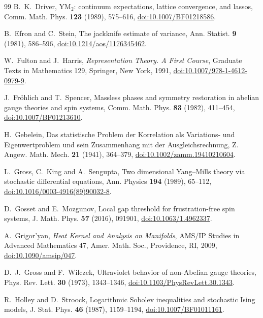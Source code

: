\begin{thebibliography}{99}
B.~K.~Driver, YM$_2$: continuum expectations, lattice convergence, and lassos, Comm. Math. Phys. \textbf{123} (1989), 575--616, \href{https://doi.org/10.1007/BF01218586}{doi:10.1007/BF01218586}.

B.~Efron and C.~Stein, The jackknife estimate of variance, Ann. Statist. \textbf{9} (1981), 586--596, \href{https://doi.org/10.1214/aos/1176345462}{doi:10.1214/aos/1176345462}.

W.~Fulton and J.~Harris, \emph{Representation Theory. A First Course},
Graduate Texts in Mathematics 129, Springer, New York, 1991,
\href{https://doi.org/10.1007/978-1-4612-0979-9}{doi:10.1007/978-1-4612-0979-9}.

J.~Fr\"ohlich and T.~Spencer, Massless phases and symmetry restoration in abelian gauge theories and spin systems, Comm. Math. Phys. \textbf{83} (1982), 411--454, \href{https://doi.org/10.1007/BF01213610}{doi:10.1007/BF01213610}.

H.~Gebelein, Das statistische Problem der Korrelation als Variations- und Eigenwertproblem und sein Zusammenhang mit der Ausgleichsrechnung, Z. Angew. Math. Mech. \textbf{21} (1941), 364--379, \href{https://doi.org/10.1002/zamm.19410210604}{doi:10.1002/zamm.19410210604}.

L.~Gross, C.~King and A.~Sengupta, Two dimensional Yang--Mills theory via stochastic differential equations, Ann. Physics \textbf{194} (1989), 65--112, \href{https://doi.org/10.1016/0003-4916(89)90032-8}{doi:10.1016/0003-4916(89)90032-8}.

D.~Gosset and E.~Mozgunov, Local gap threshold for frustration-free spin systems, J. Math. Phys. \textbf{57} (2016), 091901, \href{https://doi.org/10.1063/1.4962337}{doi:10.1063/1.4962337}.

A.~Grigor'yan, \emph{Heat Kernel and Analysis on Manifolds}, AMS/IP Studies in Advanced Mathematics 47, Amer. Math. Soc., Providence, RI, 2009, \href{https://doi.org/10.1090/amsip/047}{doi:10.1090/amsip/047}.

D.~J.~Gross and F.~Wilczek, Ultraviolet behavior of non-Abelian gauge theories, Phys. Rev. Lett. \textbf{30} (1973), 1343--1346, \href{https://doi.org/10.1103/PhysRevLett.30.1343}{doi:10.1103/PhysRevLett.30.1343}.

R.~Holley and D.~Stroock, Logarithmic Sobolev inequalities and stochastic Ising models, J. Stat. Phys. \textbf{46} (1987), 1159--1194, \href{https://doi.org/10.1007/BF01011161}{doi:10.1007/BF01011161}.


\end{thebibliography}
